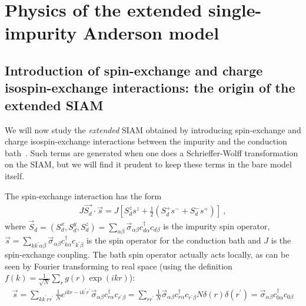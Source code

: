 \chapter{Physics of the extended single-impurity Anderson model}
\label{esiam-urg}
\section{Introduction of spin-exchange and charge isospin-exchange interactions: the origin of the extended SIAM}
We will now study the {\it extended} SIAM obtained by introducing spin-exchange and charge isospin-exchange interactions between the impurity and the conduction bath~\cite{zitko_2006}. Such terms are generated when one does a Schrieffer-Wolff transformation on the SIAM, but we will find it prudent to keep these terms in the bare model itself.

The spin-exchange interaction has the form
\begin{equation}\begin{aligned}
	J \vec{S_d}\cdot\vec{s} = J \left[S_d^z s^z + \frac{1}{2}\left( S_d^+ s^- + S_d^- s^+ \right) \right] ~,
\end{aligned}\end{equation}
where \(\vec S_d = \left(S_d^x, S_d^y, S_d^z\right) = \sum_{\alpha\beta}\vec \sigma_{\alpha\beta}c^\dagger_{d\alpha}c_{d\beta}\) is the impurity spin operator, \(\vec s = \sum_{kk^\prime\alpha\beta}\vec \sigma_{\alpha\beta}c^\dagger_{k\alpha}c_{k^\prime\beta}\) is the spin operator for the conduction bath and \(J\) is the spin-exchange coupling. The bath spin operator actually acts locally, as can be seen by Fourier transforming to real space (using the definition \(f(k) = \frac{1}{\sqrt N}\sum_r g(r)\exp(ikr)\)):
\begin{equation}\begin{aligned}
	\vec s = \sum_{k k^\prime r r^\prime} \frac{1}{N} e^{ikr - ik^\prime r^\prime} \vec \sigma_{\alpha\beta} c^\dagger_{r\alpha} c_{r^\prime\beta} = \sum_{rr^\prime}\frac{1}{N}\vec \sigma_{\alpha\beta} c^\dagger_{r\alpha} c_{r^\prime\beta} N \delta(r)\delta(r^\prime) = \vec \sigma_{\alpha\beta} c^\dagger_{0\alpha} c_{0\beta}
\end{aligned}\end{equation}

